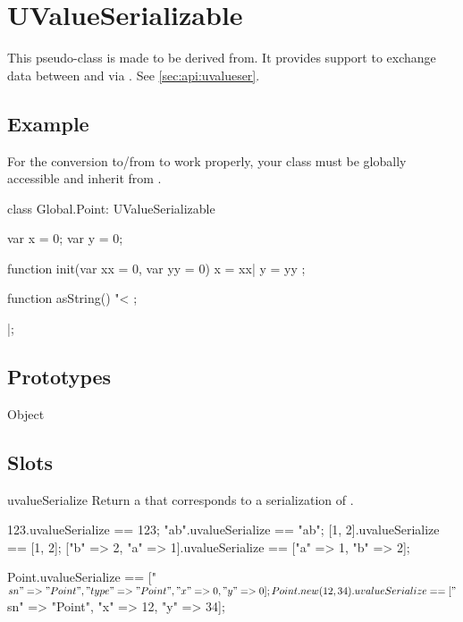 
\section{UValueSerializable}

This pseudo-class is made to be derived from.  It provides support to
exchange data between \Cxx and \us via .  See
\autoref{sec:api:uvalueser}.

\subsection{Example}

For the conversion to/from \Cxx to work properly, your class must be
globally accessible and inherit from .

\begin{urbiscript}
class Global.Point: UValueSerializable
{
  var x = 0;
  var y = 0;

  function init(var xx = 0, var yy = 0)
  {
    x = xx|
    y = yy
  };

  function asString()
  {
    "<%
  };
}|;
\end{urbiscript}

\subsection{Prototypes}

\begin{refObjects}
\item[Object]
\end{refObjects}

\subsection{Slots}

\begin{urbiscriptapi}
\item[uvalueSerialize]%
  Return a  that corresponds to a serialization of \this.
\begin{urbiassert}
                 123.uvalueSerialize == 123;
                "ab".uvalueSerialize == "ab";
              [1, 2].uvalueSerialize == [1, 2];
["b" => 2, "a" => 1].uvalueSerialize == ["a" => 1, "b" => 2];

Point.uvalueSerialize
   == ["$sn" => "Point", "type" => "Point", "x" => 0, "y" => 0];
Point.new(12, 34).uvalueSerialize
   == ["$sn" => "Point", "x" => 12, "y" => 34];
\end{urbiassert}

\end{urbiscriptapi}

